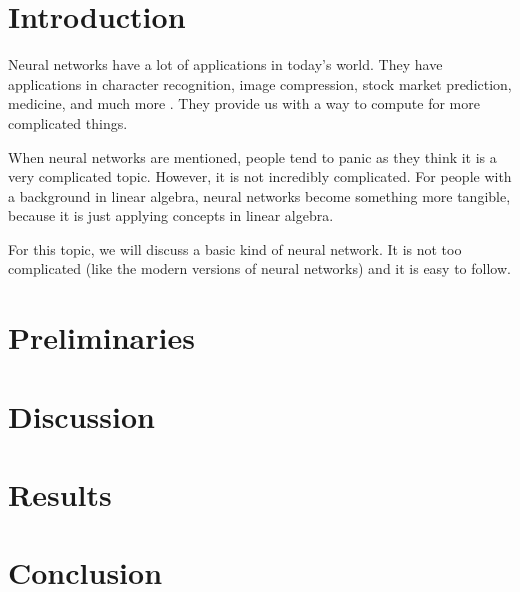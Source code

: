 \documentclass[a4paper, 11pt, english]{article}
\begin{document}
\section{Introduction}
Neural networks have a lot of applications in today's world. They have applications in character recognition, image compression, stock market prediction, medicine, and much more \cite{dk1}. They provide us with a way to compute for more complicated things. %
\par When neural networks are mentioned, people tend to panic as they think it is a very complicated topic. However, it is not incredibly complicated. For people with a background in linear algebra, neural networks become something more tangible, because it is just applying concepts in linear algebra.
\par For this topic, we will discuss a basic kind of neural network. It is not too complicated (like the modern versions of neural networks) and it is easy to follow.

\section{Preliminaries}

\section{Discussion}

\section{Results}

\section{Conclusion}

\newpage
\printbibliography
\end{document}
